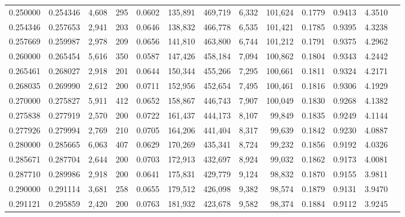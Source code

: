 \begin{tabular}{rrrrrrrrrrrrr}
0.250000 & 0.254346 & 4,608 & 295 &                                     0.0602 & 135,891 & 469,719 &   6,332 & 101,624 & 0.1779 & 0.9413 & 4.3510 \\
0.254346 & 0.257653 & 2,941 & 203 &                                     0.0646 & 138,832 & 466,778 &   6,535 & 101,421 & 0.1785 & 0.9395 & 4.3238 \\
0.257669 & 0.259987 & 2,978 & 209 &                                     0.0656 & 141,810 & 463,800 &   6,744 & 101,212 & 0.1791 & 0.9375 & 4.2962 \\
0.260000 & 0.265454 & 5,616 & 350 &                                     0.0587 & 147,426 & 458,184 &   7,094 & 100,862 & 0.1804 & 0.9343 & 4.2442 \\
0.265461 & 0.268027 & 2,918 & 201 &                                     0.0644 & 150,344 & 455,266 &   7,295 & 100,661 & 0.1811 & 0.9324 & 4.2171 \\
0.268035 & 0.269990 & 2,612 & 200 &                                     0.0711 & 152,956 & 452,654 &   7,495 & 100,461 & 0.1816 & 0.9306 & 4.1929 \\
0.270000 & 0.275827 & 5,911 & 412 &                                     0.0652 & 158,867 & 446,743 &   7,907 & 100,049 & 0.1830 & 0.9268 & 4.1382 \\
0.275838 & 0.277919 & 2,570 & 200 &                                     0.0722 & 161,437 & 444,173 &   8,107 &  99,849 & 0.1835 & 0.9249 & 4.1144 \\
0.277926 & 0.279994 & 2,769 & 210 &                                     0.0705 & 164,206 & 441,404 &   8,317 &  99,639 & 0.1842 & 0.9230 & 4.0887 \\
0.280000 & 0.285665 & 6,063 & 407 &                                     0.0629 & 170,269 & 435,341 &   8,724 &  99,232 & 0.1856 & 0.9192 & 4.0326 \\
0.285671 & 0.287704 & 2,644 & 200 &                                     0.0703 & 172,913 & 432,697 &   8,924 &  99,032 & 0.1862 & 0.9173 & 4.0081 \\
0.287710 & 0.289986 & 2,918 & 200 &                                     0.0641 & 175,831 & 429,779 &   9,124 &  98,832 & 0.1870 & 0.9155 & 3.9811 \\
0.290000 & 0.291114 & 3,681 & 258 &                                     0.0655 & 179,512 & 426,098 &   9,382 &  98,574 & 0.1879 & 0.9131 & 3.9470 \\
0.291121 & 0.295859 & 2,420 & 200 &                                     0.0763 & 181,932 & 423,678 &   9,582 &  98,374 & 0.1884 & 0.9112 & 3.9245 \\

\end{tabular}
